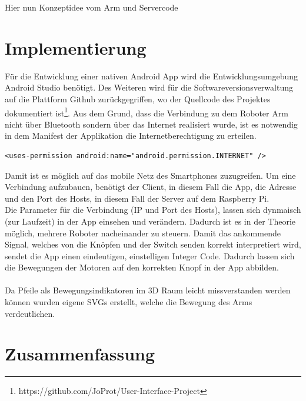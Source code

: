 \documentclass[12pt,					%
							 oneside,			%
							 a4paper,			%
							 halfparskip,		%
							 liststotoc,			%
							 bibtotoc,			%
							 fleqn,				%
							 pointlessnumbers]	%
							 {scrreprt}
\begin{document}
Hier nun Konzeptidee vom Arm und Servercode

\chapter{Implementierung}	
Für die Entwicklung einer nativen Android App wird die Entwicklungsumgebung Android Studio benötigt. Des Weiteren wird für die Softwareversionsverwaltung auf die Plattform Github zurückgegriffen, wo der Quellcode des Projektes dokumentiert ist\footnote{https://github.com/JoProt/User-Interface-Project}. Aus dem Grund, dass die Verbindung zu dem Roboter Arm nicht über Bluetooth sondern über das Internet realisiert wurde, ist es notwendig in dem Manifest der Applikation die Internetberechtigung zu erteilen. \\
\begin{lstlisting}
<uses-permission android:name="android.permission.INTERNET" />
\end{lstlisting}

Damit ist es möglich auf das mobile Netz des Smartphones zuzugreifen. Um eine Verbindung aufzubauen, benötigt der Client, in diesem Fall die App, die Adresse und den Port des Hosts, in diesem Fall der Server auf dem Raspberry Pi. \\
Die Parameter für die Verbindung (IP und Port des Hosts), lassen sich dynmaisch (zur Laufzeit) in der App einsehen und verändern. Dadurch ist es in der Theorie möglich, mehrere Roboter nacheinander zu steuern. 
Damit das ankommende Signal, welches von die Knöpfen und der Switch senden korrekt interpretiert wird, sendet die App einen eindeutigen, einstelligen Integer Code. Dadurch lassen sich die Bewegungen der Motoren auf den korrekten Knopf in der App abbilden. \\ \\
Da Pfeile als Bewegungsindikatoren im 3D Raum leicht missverstanden werden können wurden eigene SVGs erstellt, welche die Bewegung des Arms verdeutlichen. 
\chapter{Zusammenfassung}	


	
	
\end{document}
